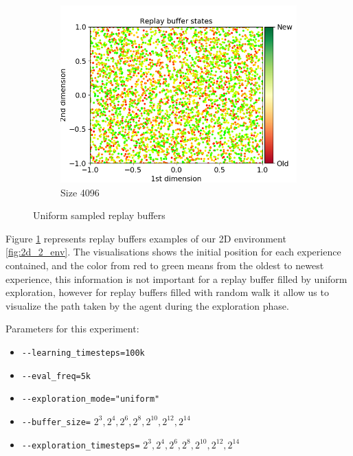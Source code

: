 \documentclass{article}
\begin{document}
\begin{figure}[H]
\begin{subfigure}[b]{0.3\linewidth}
    \includegraphics[width=\linewidth]{Study_1/buffer/uniform_4096.png}
    \caption{Size 4096}
  \end{subfigure}
  \caption{Uniform sampled replay buffers}
  \label{fig:buffers_uniform}
\end{figure}

Figure \ref{fig:buffers_uniform} represents replay buffers examples of our 2D environment \ref{fig:2d_2_env}. The visualisations shows the initial position for each experience contained, and the color from red to green means from the oldest to newest experience, this information is not important for a replay buffer filled by uniform exploration, however for replay buffers filled with random walk it allow us to visualize the path taken by the agent during the exploration phase.

Parameters for this experiment:
\begin{itemize}
    \item[] \lstinline|--learning_timesteps=100k|
    \item[] \lstinline|--eval_freq=5k|
    \item[] \lstinline|--exploration_mode="uniform"|
    \item[] \lstinline|--buffer_size=| $2^3, 2^4, 2^6, 2^8, 2^{10}, 2^{12}, 2^{14}$
    \item[] \lstinline|--exploration_timesteps=| $2^3, 2^4, 2^6, 2^8, 2^{10}, 2^{12}, 2^{14}$
\end{itemize}
\end{document}
